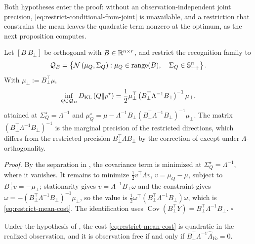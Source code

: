 Both hypotheses enter the proof: without an observation-independent joint
precision, \eqref{eq:restrict-conditional-from-joint} is unavailable, and a
restriction that constrains the mean leaves the quadratic term nonzero at the
optimum, as the next proposition computes.

Let \([B\ B_\perp]\) be orthogonal with \(B\in\mathbb R^{n\times r}\), and restrict
the recognition family to
\begin{equation}
\mathcal Q_{B}=\left\{\mathcal N\left(\mu_Q,\Sigma_Q\right):
\mu_Q\in\operatorname{range}(B),
\quad
\Sigma_Q\in\mathbb S_{++}^{n}\right\}.
\label{eq:restrict-mean-family}
\end{equation}
With \(\mu_\perp:=B_\perp^\top\mu\),
\begin{equation}
\inf_{Q\in\mathcal Q_B}D_{\mathrm{KL}}\left(Q\Vert p^\star\right)
=\frac12\mu_\perp^\top\left(B_\perp^\top\Lambda^{-1}B_\perp\right)^{-1}\mu_\perp,
\label{eq:restrict-mean-cost}
\end{equation}
attained at \(\Sigma_Q^\star=\Lambda^{-1}\) and
\(\mu_Q^\star=\mu-\Lambda^{-1}B_\perp(B_\perp^\top\Lambda^{-1}B_\perp)^{-1}\mu_\perp\).
The matrix \((B_\perp^\top\Lambda^{-1}B_\perp)^{-1}\) is the marginal precision
of the restricted directions, which differs from the restricted precision
\(B_\perp^\top\Lambda B_\perp\) by the correction of
 except under
\(\Lambda\)-orthogonality. 

\noindent\emph{Proof.}
By the separation in , the covariance
term is minimized at \(\Sigma_Q^\star=\Lambda^{-1}\), where it vanishes. It
remains to minimize \(\tfrac12v^\top\Lambda v\), \(v=\mu_Q-\mu\), subject to
\(B_\perp^\top v=-\mu_\perp\); stationarity gives \(v=\Lambda^{-1}B_\perp\omega\)
and the constraint gives \(\omega=-(B_\perp^\top\Lambda^{-1}B_\perp)^{-1}\mu_\perp\),
so the value is \(\tfrac12\omega^\top(B_\perp^\top\Lambda^{-1}B_\perp)\omega\),
which is \eqref{eq:restrict-mean-cost}. The identification uses
\(\operatorname{Cov}(B_\perp^\top Y)=B_\perp^\top\Lambda^{-1}B_\perp\). \(\square\)

Under the hypothesis of
, the cost
\eqref{eq:restrict-mean-cost} is quadratic in the realized observation, and it
is observation free if and only if
\(B_\perp^\top\Lambda^{-1}\widehat\Lambda_{Yo}=0\). 

